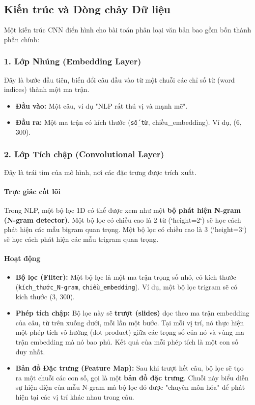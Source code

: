 \subsection{Kiến trúc và Dòng chảy Dữ liệu}
\label{ssec:cnn_architecture}
Một kiến trúc CNN điển hình cho bài toán phân loại văn bản bao gồm bốn thành phần chính:

\subsubsection{1. Lớp Nhúng (Embedding Layer)}
Đây là bước đầu tiên, biến đổi câu đầu vào từ một chuỗi các chỉ số từ (word indices) thành một ma trận.
\begin{itemize}
    \item \textbf{Đầu vào:} Một câu, ví dụ "NLP rất thú vị và mạnh mẽ".
    \item \textbf{Đầu ra:} Một ma trận có kích thước (\texttt{số\_từ}, chiều\_embedding). Ví dụ, (6, 300).
\end{itemize}

\subsubsection{2. Lớp Tích chập (Convolutional Layer)}
Đây là trái tim của mô hình, nơi các đặc trưng được trích xuất.
\paragraph{Trực giác cốt lõi}
Trong NLP, một bộ lọc 1D có thể được xem như một \textbf{bộ phát hiện N-gram (N-gram detector)}. Một bộ lọc có chiều cao là 2 từ (`height=2`) sẽ học cách phát hiện các mẫu bigram quan trọng. Một bộ lọc có chiều cao là 3 (`height=3`) sẽ học cách phát hiện các mẫu trigram quan trọng.

\paragraph{Hoạt động}
\begin{itemize}
    \item \textbf{Bộ lọc (Filter):} Một bộ lọc là một ma trận trọng số nhỏ, có kích thước (\texttt{kích\_thước\_N-gram}, \texttt{chiều\_embedding}). Ví dụ, một bộ lọc trigram sẽ có kích thước (3, 300).
    \item \textbf{Phép tích chập:} Bộ lọc này sẽ \textbf{trượt (slides)} dọc theo ma trận embedding của câu, từ trên xuống dưới, mỗi lần một bước. Tại mỗi vị trí, nó thực hiện một phép tích vô hướng (dot product) giữa các trọng số của nó và vùng ma trận embedding mà nó bao phủ. Kết quả của mỗi phép tích là một con số duy nhất.
    \item \textbf{Bản đồ Đặc trưng (Feature Map):} Sau khi trượt hết câu, bộ lọc sẽ tạo ra một chuỗi các con số, gọi là một \textbf{bản đồ đặc trưng}. Chuỗi này biểu diễn sự hiện diện của mẫu N-gram mà bộ lọc đó được "chuyên môn hóa" để phát hiện tại các vị trí khác nhau trong câu.
\end{itemize}

